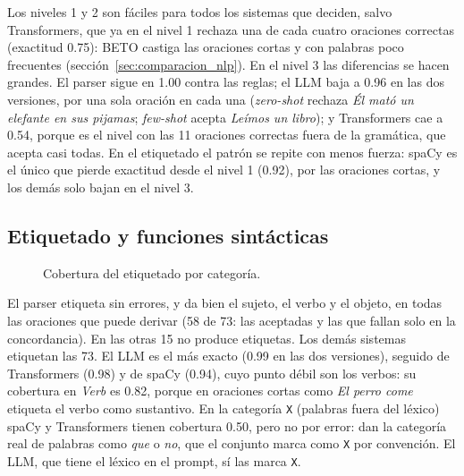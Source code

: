 Los niveles 1 y 2 son fáciles para todos los sistemas que deciden, salvo Transformers, que ya
en el nivel 1 rechaza una de cada cuatro oraciones correctas (exactitud 0.75): BETO castiga las
oraciones cortas y con palabras poco frecuentes (sección~\ref{sec:comparacion_nlp}). En el
nivel 3 las diferencias se hacen grandes. El parser sigue en 1.00 contra las reglas; el LLM baja
a 0.96 en las dos versiones, por una sola oración en cada una (\emph{zero-shot} rechaza \emph{Él
mató un elefante en sus pijamas}; \emph{few-shot} acepta \emph{Leímos un libro}); y
Transformers cae a 0.54, porque es el nivel con las 11 oraciones correctas fuera de la
gramática, que acepta casi todas. En el etiquetado el patrón se repite con menos fuerza: spaCy es
el único que pierde exactitud desde el nivel 1 (0.92), por las oraciones cortas, y los demás
solo bajan en el nivel 3.

\subsection{Etiquetado y funciones sintácticas}

\begin{table}[h]
  \centering
  \small
  \quad{}
  \caption{Exactitud del etiquetado (y oraciones con otro número de palabras), y de las
    funciones sintácticas.}
  \label{tab:etiquetado}
\end{table}

\begin{table}[h]
  \centering
  \small
  \caption{Cobertura (\emph{recall}) del etiquetado por categoría.}
  \label{tab:etiquetado_categoria}
\end{table}

\begin{figure}[h]
  \centering
  \caption{Cobertura del etiquetado por categoría.}
  \label{fig:etiquetado_categoria}
\end{figure}

El parser etiqueta sin errores, y da bien el sujeto, el verbo y el objeto, en todas las
oraciones que puede derivar (58 de 73: las aceptadas y las que fallan solo en la
concordancia). En las otras 15 no produce etiquetas. Los demás sistemas etiquetan las 73. El LLM
es el más exacto (0.99 en las dos versiones), seguido de Transformers (0.98) y de spaCy (0.94),
cuyo punto débil son los verbos: su cobertura en \textit{Verb} es 0.82, porque en oraciones
cortas como \emph{El perro come} etiqueta el verbo como sustantivo. En la categoría \texttt{X}
(palabras fuera del léxico) spaCy y Transformers tienen cobertura 0.50, pero no por error: dan la
categoría real de palabras como \emph{que} o \emph{no}, que el conjunto marca como \texttt{X}
por convención. El LLM, que tiene el léxico en el prompt, sí las marca \texttt{X}.

